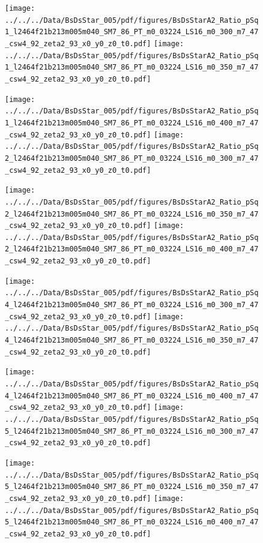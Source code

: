 \documentclass[a4paper,10pt]{article}
\begin{document}
\begin{figure}[p]
 \texttt{[image: ../../../Data/BsDsStar\_005/pdf/figures/BsDsStarA2\_Ratio\_pSq1\_l2464f21b213m005m040\_SM7\_86\_PT\_m0\_03224\_LS16\_m0\_300\_m7\_47\_csw4\_92\_zeta2\_93\_x0\_y0\_z0\_t0.pdf]} 
 \texttt{[image: ../../../Data/BsDsStar\_005/pdf/figures/BsDsStarA2\_Ratio\_pSq1\_l2464f21b213m005m040\_SM7\_86\_PT\_m0\_03224\_LS16\_m0\_350\_m7\_47\_csw4\_92\_zeta2\_93\_x0\_y0\_z0\_t0.pdf]} 
 \end{figure}
\begin{figure}[p]
 \texttt{[image: ../../../Data/BsDsStar\_005/pdf/figures/BsDsStarA2\_Ratio\_pSq1\_l2464f21b213m005m040\_SM7\_86\_PT\_m0\_03224\_LS16\_m0\_400\_m7\_47\_csw4\_92\_zeta2\_93\_x0\_y0\_z0\_t0.pdf]} 
 \texttt{[image: ../../../Data/BsDsStar\_005/pdf/figures/BsDsStarA2\_Ratio\_pSq2\_l2464f21b213m005m040\_SM7\_86\_PT\_m0\_03224\_LS16\_m0\_300\_m7\_47\_csw4\_92\_zeta2\_93\_x0\_y0\_z0\_t0.pdf]} 
 \end{figure}
\begin{figure}[p]
 \texttt{[image: ../../../Data/BsDsStar\_005/pdf/figures/BsDsStarA2\_Ratio\_pSq2\_l2464f21b213m005m040\_SM7\_86\_PT\_m0\_03224\_LS16\_m0\_350\_m7\_47\_csw4\_92\_zeta2\_93\_x0\_y0\_z0\_t0.pdf]} 
 \texttt{[image: ../../../Data/BsDsStar\_005/pdf/figures/BsDsStarA2\_Ratio\_pSq2\_l2464f21b213m005m040\_SM7\_86\_PT\_m0\_03224\_LS16\_m0\_400\_m7\_47\_csw4\_92\_zeta2\_93\_x0\_y0\_z0\_t0.pdf]} 
 \end{figure}
\clearpage
\begin{figure}[p]
 \texttt{[image: ../../../Data/BsDsStar\_005/pdf/figures/BsDsStarA2\_Ratio\_pSq4\_l2464f21b213m005m040\_SM7\_86\_PT\_m0\_03224\_LS16\_m0\_300\_m7\_47\_csw4\_92\_zeta2\_93\_x0\_y0\_z0\_t0.pdf]} 
 \texttt{[image: ../../../Data/BsDsStar\_005/pdf/figures/BsDsStarA2\_Ratio\_pSq4\_l2464f21b213m005m040\_SM7\_86\_PT\_m0\_03224\_LS16\_m0\_350\_m7\_47\_csw4\_92\_zeta2\_93\_x0\_y0\_z0\_t0.pdf]} 
 \end{figure}
\begin{figure}[p]
 \texttt{[image: ../../../Data/BsDsStar\_005/pdf/figures/BsDsStarA2\_Ratio\_pSq4\_l2464f21b213m005m040\_SM7\_86\_PT\_m0\_03224\_LS16\_m0\_400\_m7\_47\_csw4\_92\_zeta2\_93\_x0\_y0\_z0\_t0.pdf]} 
 \texttt{[image: ../../../Data/BsDsStar\_005/pdf/figures/BsDsStarA2\_Ratio\_pSq5\_l2464f21b213m005m040\_SM7\_86\_PT\_m0\_03224\_LS16\_m0\_300\_m7\_47\_csw4\_92\_zeta2\_93\_x0\_y0\_z0\_t0.pdf]} 
 \end{figure}
\begin{figure}[p]
 \texttt{[image: ../../../Data/BsDsStar\_005/pdf/figures/BsDsStarA2\_Ratio\_pSq5\_l2464f21b213m005m040\_SM7\_86\_PT\_m0\_03224\_LS16\_m0\_350\_m7\_47\_csw4\_92\_zeta2\_93\_x0\_y0\_z0\_t0.pdf]} 
 \texttt{[image: ../../../Data/BsDsStar\_005/pdf/figures/BsDsStarA2\_Ratio\_pSq5\_l2464f21b213m005m040\_SM7\_86\_PT\_m0\_03224\_LS16\_m0\_400\_m7\_47\_csw4\_92\_zeta2\_93\_x0\_y0\_z0\_t0.pdf]} 
 \end{figure}
\clearpage
\clearpage
\end{document}
